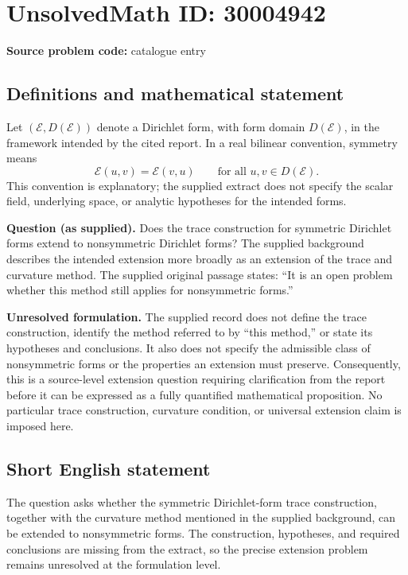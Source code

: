 \documentclass[11pt]{article}
\begin{document}
\section*{UnsolvedMath ID: 30004942}
\textbf{Source problem code:} catalogue entry
\subsection{Definitions and mathematical statement}
Let \((\mathcal E,D(\mathcal E))\) denote a Dirichlet form, with form domain \(D(\mathcal E)\), in the framework intended by the cited report. In a real bilinear convention, symmetry means
\[
\mathcal E(u,v)=\mathcal E(v,u)\qquad\text{for all }u,v\in D(\mathcal E).
\]
This convention is explanatory; the supplied extract does not specify the scalar field, underlying space, or analytic hypotheses for the intended forms.

\textbf{Question (as supplied).} Does the trace construction for symmetric Dirichlet forms extend to nonsymmetric Dirichlet forms? The supplied background describes the intended extension more broadly as an extension of the trace and curvature method. The supplied original passage states: ``It is an open problem whether this method still applies for nonsymmetric forms.''

\textbf{Unresolved formulation.} The supplied record does not define the trace construction, identify the method referred to by ``this method,'' or state its hypotheses and conclusions. It also does not specify the admissible class of nonsymmetric forms or the properties an extension must preserve. Consequently, this is a source-level extension question requiring clarification from the report before it can be expressed as a fully quantified mathematical proposition. No particular trace construction, curvature condition, or universal extension claim is imposed here.
\subsection{Short English statement}
The question asks whether the symmetric Dirichlet-form trace construction, together with the curvature method mentioned in the supplied background, can be extended to nonsymmetric forms. The construction, hypotheses, and required conclusions are missing from the extract, so the precise extension problem remains unresolved at the formulation level.
\end{document}
